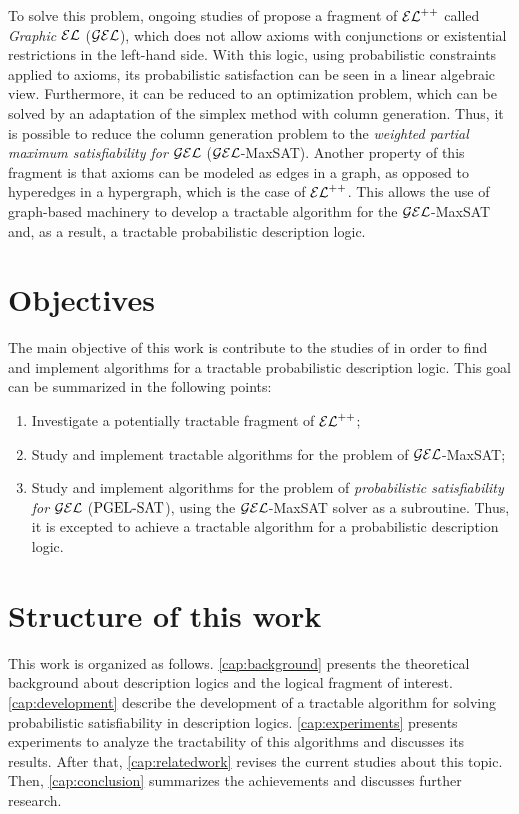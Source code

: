To solve this problem, ongoing studies of \citet{Fin2020} propose a fragment of $\mathcal{EL}^{++}$ called \emph{Graphic $\mathcal{EL}$} ($\mathcal{GEL}$), which does not allow axioms with conjunctions or existential restrictions in the left-hand side. With this logic, using probabilistic constraints applied to axioms, its probabilistic satisfaction can be seen in a linear algebraic view. Furthermore, it can be reduced to an optimization problem, which can be solved by an adaptation of the simplex method with column generation. Thus, it is possible to reduce the column generation problem to the \emph{weighted partial maximum satisfiability for $\mathcal{GEL}$} ($\mathcal{GEL}$-MaxSAT). Another property of this fragment is that axioms can be modeled as edges in a graph, as opposed to hyperedges in a hypergraph, which is the case of $\mathcal{EL}^{++}$. This allows the use of graph-based machinery to develop a tractable algorithm for the $\mathcal{GEL}$-MaxSAT and, as a result, a tractable probabilistic description logic.

\section{Objectives}
The main objective of this work is contribute to the studies of \citet{Fin2020} in order to find and implement algorithms for a tractable probabilistic description logic. This goal can be summarized in the following points: 

\begin{enumerate}
  \item Investigate a potentially tractable fragment of $\mathcal{EL}^{++}$;
  \item Study and implement tractable algorithms for the problem of $\mathcal{GEL}$-MaxSAT;
  \item Study and implement algorithms for the problem of \emph{probabilistic satisfiability for $\mathcal{GEL}$} ($\text{PGEL-SAT}$), using the $\mathcal{GEL}$-MaxSAT solver as a subroutine. Thus, it is excepted to achieve a tractable algorithm for a probabilistic description logic.
\end{enumerate}

\section{Structure of this work}
This work is organized as follows. \cref{cap:background} presents the theoretical background about description logics and the logical fragment of interest. \cref{cap:development} describe the development of a tractable algorithm for solving probabilistic satisfiability in description logics. \cref{cap:experiments} presents experiments to analyze the tractability of this algorithms and discusses its results. After that, \cref{cap:relatedwork} revises the current studies about this topic. Then, \cref{cap:conclusion} summarizes the achievements and discusses further research. 